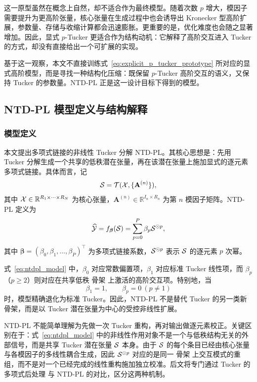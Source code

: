 这一原型虽然在概念上自然，却不适合作为最终模型。随着次数 $p$ 增大，模因子需要提升为更高阶张量，核心张量在生成过程中也会诱导出 Kronecker 型高阶扩展，参数量、存储与收缩计算都会迅速膨胀。更重要的是，优化难度也会随之显著增加。因此，显式 $p$-Tucker 更适合作为结构动机：它解释了高阶交互进入 Tucker 的方式，却没有直接给出一个可扩展的实现。

基于这一观察，本文不直接训练式~\eqref{eq:explicit_p_tucker_prototype} 所对应的显式高阶模型，而是寻找一种结构化压缩：既保留 $p$-Tucker 高阶交互的语义，又保持 Tucker 的参数量。NTD-PL 正是这一设计目标下得到的模型。

\subsection{NTD-PL 模型定义与结构解释}

\subsubsection{模型定义}

本文提出多项式链接的非线性 Tucker 分解 NTD-PL。其核心思想是：先用 Tucker 分解生成一个共享的低秩潜在张量，再在该潜在张量上施加显式的逐元素多项式链接。具体而言，记
\begin{equation}
\label{eq:ntdpl_latent_tensor}
\mathcal{S}
=
\mathcal{T}(\mathcal{X},\{\mathbf{A}^{(n)}\}),
\end{equation}
其中 $\mathcal{X}\in\mathbb R^{R_1\times\cdots\times R_N}$ 为核心张量，$\mathbf A^{(n)}\in\mathbb R^{I_n\times R_n}$ 为第 $n$ 模因子矩阵。NTD-PL 定义为
\begin{equation}
\label{eq:ntdpl_model}
\widehat{\mathcal{Y}}
=
 f_{\boldsymbol\beta}(\mathcal{S})
=
\sum_{p=0}^{P} \beta_p \mathcal{S}^{\odot p},
\end{equation}
其中 $\boldsymbol\beta=(\beta_0,\beta_1,\dots,\beta_P)^\top$ 为多项式链接系数，$\mathcal{S}^{\odot p}$ 表示 $\mathcal{S}$ 的逐元素 $p$ 次幂。

式~\eqref{eq:ntdpl_model} 中，$\beta_0$ 对应常数偏置项，$\beta_1$ 对应标准 Tucker 线性项，而 $\beta_p$（$p\ge 2$）则对应在共享低秩 骨架 上激活的高阶交互项。特别地，当
\begin{equation}
\beta_1=1,\qquad \beta_p=0\ (p\neq 1)
\end{equation}
时，模型精确退化为标准 Tucker。因此，NTD-PL 不是替代 Tucker 的另一类新骨架，而是以 Tucker 潜在张量为中心的受控非线性扩展。

NTD-PL 不能简单理解为先做一次 Tucker 重构，再对输出做逐元素校正。关键区别在于：式~\eqref{eq:ntdpl_model} 中的非线性作用对象不是一个与低秩结构无关的外部信号，而是共享 Tucker 潜在张量 $\mathcal{S}$ 本身。由于 $\mathcal{S}$ 的每个条目已经由核心张量与各模因子的多线性耦合生成，因此 $\mathcal{S}^{\odot p}$ 对应的是同一 骨架 上交互模式的重组，而不是对一个已经完成的线性重构施加独立校准。后文将专门通过 Tucker 的多项式后处理 与 NTD-PL 的对比，区分这两种机制。

